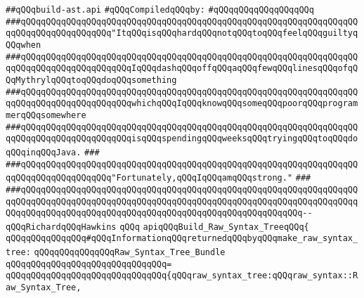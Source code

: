 \label{src/lib/c-kit/src/ast/build-ast.api}
\verb|##qQQqbuild-ast.api|\newline
\newline
\verb|#qQQqCompiledqQQqby:|\newline
\verb|#qQQqqQQqqQQqqQQqqQQq|\newline
\newline
\verb|###qQQqqQQqqQQqqQQqqQQqqQQqqQQqqQQqqQQqqQQqqQQqqQQqqQQqqQQqqQQqqQQqqQQqqQQqqQQqqQQqqQQqqQQq"ItqQQqisqQQqhardqQQqnotqQQqtoqQQqfeelqQQqguiltyqQQqwhen|\newline
\verb|###qQQqqQQqqQQqqQQqqQQqqQQqqQQqqQQqqQQqqQQqqQQqqQQqqQQqqQQqqQQqqQQqqQQqqQQqqQQqqQQqqQQqqQQqqQQqIqQQqdashqQQqoffqQQqaqQQqfewqQQqlinesqQQqofqQQqMythrylqQQqtoqQQqdoqQQqsomething|\newline
\verb|###qQQqqQQqqQQqqQQqqQQqqQQqqQQqqQQqqQQqqQQqqQQqqQQqqQQqqQQqqQQqqQQqqQQqqQQqqQQqqQQqqQQqqQQqqQQqwhichqQQqIqQQqknowqQQqsomeqQQqpoorqQQqprogrammerqQQqsomewhere|\newline
\verb|###qQQqqQQqqQQqqQQqqQQqqQQqqQQqqQQqqQQqqQQqqQQqqQQqqQQqqQQqqQQqqQQqqQQqqQQqqQQqqQQqqQQqqQQqqQQqisqQQqspendingqQQqweeksqQQqtryingqQQqtoqQQqdoqQQqinqQQqJava.|\newline
\verb|###|\newline
\verb|###qQQqqQQqqQQqqQQqqQQqqQQqqQQqqQQqqQQqqQQqqQQqqQQqqQQqqQQqqQQqqQQqqQQqqQQqqQQqqQQqqQQqqQQq"Fortunately,qQQqIqQQqamqQQqstrong."|\newline
\verb|###|\newline
\verb|###qQQqqQQqqQQqqQQqqQQqqQQqqQQqqQQqqQQqqQQqqQQqqQQqqQQqqQQqqQQqqQQqqQQqqQQqqQQqqQQqqQQqqQQqqQQqqQQqqQQqqQQqqQQqqQQqqQQqqQQqqQQqqQQqqQQqqQQqqQQqqQQqqQQqqQQqqQQqqQQqqQQqqQQqqQQqqQQqqQQqqQQqqQQqqQQqqQQq--qQQqRichardqQQqHawkins|\newline
\newline
\newline
\verb|qQQq|\newline
\verb|apiqQQqBuild_Raw_Syntax_TreeqQQq{|\newline
\newline
\newline
\verb|qQQqqQQqqQQqqQQq#qQQqInformationqQQqreturnedqQQqbyqQQqmake_raw_syntax_tree:|\newline
\newline
\verb|qQQqqQQqqQQqqQQqRaw_Syntax_Tree_Bundle|\newline
\verb|qQQqqQQqqQQqqQQqqQQqqQQqqQQqqQQq=|\newline
\verb|qQQqqQQqqQQqqQQqqQQqqQQqqQQqqQQq{qQQqraw_syntax_tree:qQQqraw_syntax::Raw_Syntax_Tree,|\newline
